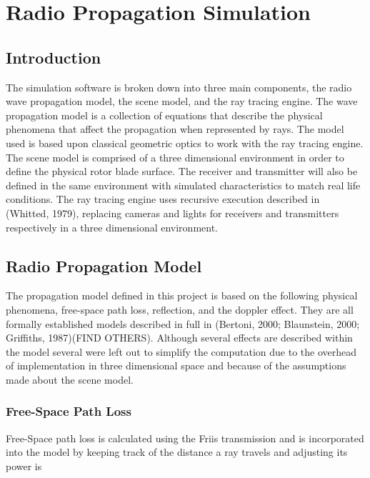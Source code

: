 \chapter{Radio Propagation Simulation} \label{ch:radio_propagation}

\section{Introduction}
The simulation software is broken down into three main components, the radio wave propagation model, the scene model, and the ray tracing engine. The wave propagation model is a collection of equations that describe the physical phenomena that affect the propagation when represented by rays. The model used is based upon classical geometric optics to work with the ray tracing engine. The scene model is comprised of a three dimensional environment in order to define the physical rotor blade surface. The receiver and transmitter will also be defined in the same environment with simulated characteristics to match real life conditions. The ray tracing engine uses recursive execution described in (Whitted, 1979), replacing cameras and lights for receivers and transmitters respectively in a three dimensional environment.

\section{Radio Propagation Model}
The propagation model defined in this project is based on the following physical phenomena, free-space path loss, reflection, and the doppler effect. They are all formally established models described in full in (Bertoni, 2000; Blaunstein, 2000; Griffiths, 1987)(FIND OTHERS). Although several effects are described within the model several were left out to simplify the computation due to the overhead of implementation in three dimensional space and because of the assumptions made about the scene model.

\subsection{Free-Space Path Loss}
Free-Space path loss is calculated using the Friis transmission and is incorporated into the model by keeping track of the distance a ray travels and adjusting its power is

